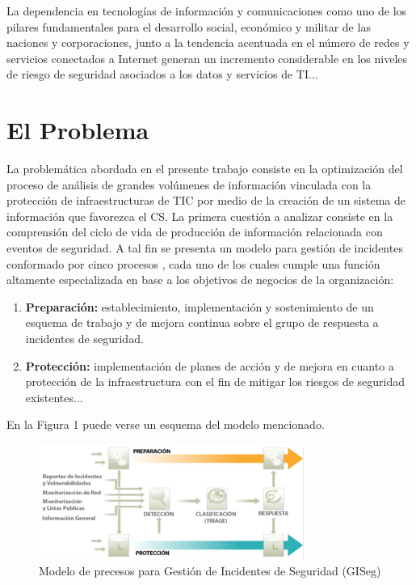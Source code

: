 \documentclass[a4paper]{./plantillas/llncs}
\begin{document}
La dependencia en tecnologías de información y comunicaciones como uno de los pilares fundamentales para el desarrollo social, económico y militar de las naciones y corporaciones,  junto a la tendencia acentuada en el número de redes y servicios conectados a Internet generan un incremento considerable en los niveles de riesgo de seguridad asociados a los datos y servicios de TI...

\section{El Problema}

La  problemática abordada en el presente trabajo consiste en la optimización del proceso de análisis de grandes volúmenes de información vinculada con la protección de infraestructuras de TIC por medio de la creación de un sistema de información que favorezca el CS. La primera cuestión a analizar consiste en la comprensión del ciclo de vida de producción de información relacionada con eventos de seguridad. A tal fin se presenta un modelo para gestión de incidentes conformado por cinco procesos \cite{b1}, cada uno de los cuales cumple una función altamente especializada en base a los objetivos de negocios de la organización:


\begin{enumerate}
\item {\bfseries Preparación:} establecimiento, implementación y sostenimiento de un esquema de trabajo y de mejora continua sobre el grupo de respuesta a incidentes de seguridad.
\item {\bfseries Protección:} implementación de planes de acción y de mejora en cuanto a protección de la infraestructura con el fin de mitigar los riesgos de seguridad existentes...
\end{enumerate}


En la Figura 1 puede verse un esquema del modelo mencionado. \newline

\begin{figure}
\centering
\includegraphics[scale=0.4]{./img/1-gis}
\caption{Modelo de precesos para Gestión de Incidentes de Seguridad (GISeg)}
\end{figure}
\end{document}

